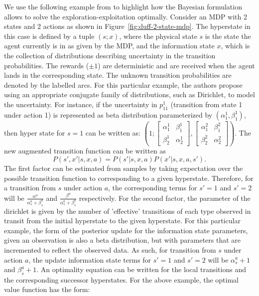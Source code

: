 We use the following example from  to highlight how the Bayesian formulation allows to solve the exploration-exploitation optimally. Consider an MDP with 2 states and 2 actions as shown in Figure~\ref{fig:duff-2-state-mdp}. The hyperstate in this case is defined by a tuple $(s;x)$, where the physical state $s$ is the state the agent currently is in as given by the MDP, and the information state $x$, which is the collection of distributions describing uncertainty in the transition probabilities. The rewards ($\pm 1$) are deterministic and are received when the agent lands in the corresponding state. The unknown transition probabilities are denoted by the labelled arcs. For this particular example, the authors propose using an appropriate conjugate family of distributions, such as Dirichlet, to model the uncertainty. For instance, if the uncertainty in $p_{11}^1$ (transition from state 1 under action 1) is represented as beta distribution parameterized by $(\alpha_1^1, \beta_1^1)$, then hyper state for $s=1$ can be written as: $(1; \begin{bmatrix} \alpha_1^1& \beta_1^1\\\beta_2^1& \alpha_2^1 \end{bmatrix}, \begin{bmatrix} \alpha_1^2& \beta_1^2\\\beta_2^2& \alpha_2^2 \end{bmatrix})$.
The new augmented transition function can be written as 
\begin{equation*}
    P(s',x' |s,x,a) = P(s'|s,x,a) P(x'|s,x,a,s').    
\end{equation*}
The first factor can be estimated from samples by taking expectation over the possible transition function to corresponding to a given hyperstate. Therefore, for a transition from $s$ under action $a$, the corresponding terms for $s'=1$ and $s'=2$ will be $\frac{\alpha^{a}}{\alpha_{s}^{a} + \beta_{s}^{a}}$  and $\frac{\beta^{a}}{\alpha_{s}^{a} + \beta_{s}^{a}}$ respectively.
For the second factor, the parameter of the dirichlet is given by  the number of 'effective' transitions of each type observed in transit from the initial hyperstate to the given hyperstate. 
For this particular example, the form of the posterior update for the information state parameters, given an observation is also a beta distribution, but with parameters that are incremented to reflect the observed data. As such, for transition from $s$ under action $a$, the update information state terms for $s'=1$ and $s'=2$ will be $\alpha_{s}^{a}+1$ and $\beta_{s}^{a}+1$. An optimality equation can be written for the local transitions and the corresponding successor hyperstates. For the above example, the optimal value function has the form:

